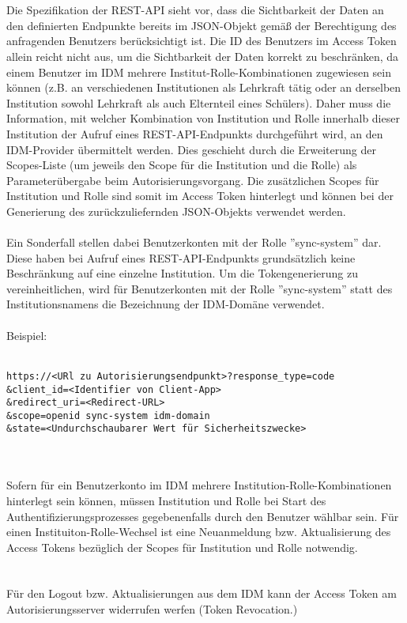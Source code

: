\\
\\
Die Spezifikation der REST-API sieht vor, dass die Sichtbarkeit der Daten an den definierten Endpunkte bereits im JSON-Objekt gemäß der Berechtigung des anfragenden Benutzers berücksichtigt ist. 
Die ID des Benutzers im Access Token allein reicht nicht aus, um die Sichtbarkeit der Daten korrekt zu beschränken, da einem Benutzer im IDM mehrere Institut-Rolle-Kombinationen zugewiesen sein können (z.B. an verschiedenen Institutionen als Lehrkraft tätig oder an derselben Institution sowohl Lehrkraft als auch Elternteil eines Schülers). 
Daher muss die Information, mit welcher Kombination von Institution und Rolle innerhalb dieser Institution der Aufruf eines REST-API-Endpunkts durchgeführt wird, an den IDM-Provider übermittelt werden. 
Dies geschieht durch die Erweiterung der Scopes-Liste (um jeweils den Scope für die Institution und die Rolle) als Parameterübergabe beim Autorisierungsvorgang. 
Die zusätzlichen Scopes für Institution und Rolle sind somit im Access Token hinterlegt und können bei der Generierung des zurückzuliefernden JSON-Objekts verwendet werden. \\
\\
Ein Sonderfall stellen dabei Benutzerkonten mit der Rolle ''sync-system'' dar. 
Diese haben bei Aufruf eines REST-API-Endpunkts grundsätzlich keine Beschränkung auf eine einzelne Institution. 
Um die Tokengenerierung zu vereinheitlichen, wird für Benutzerkonten mit der Rolle ''sync-system'' statt des Institutionsnamens die Bezeichnung der IDM-Domäne verwendet.\\
\\
Beispiel:\\
\\
\begin{verbatim}
https://<URl zu Autorisierungsendpunkt>?response_type=code
&client_id=<Identifier von Client-App>
&redirect_uri=<Redirect-URL>
&scope=openid sync-system idm-domain
&state=<Undurchschaubarer Wert für Sicherheitszwecke>
\end{verbatim}
\\
\\
Sofern für ein Benutzerkonto im IDM mehrere Institution-Rolle-Kombinationen hinterlegt sein können, müssen Institution und Rolle bei Start des Authentifizierungsprozesses gegebenenfalls durch den Benutzer wählbar sein. 
Für einen Instituiton-Rolle-Wechsel ist eine Neuanmeldung bzw. Aktualisierung des Access Tokens bezüglich der Scopes für Institution und Rolle notwendig. \\
\\
\\
Für den Logout bzw. Aktualisierungen aus dem IDM kann der Access Token am Autorisierungsserver widerrufen werfen (Token Revocation.)
